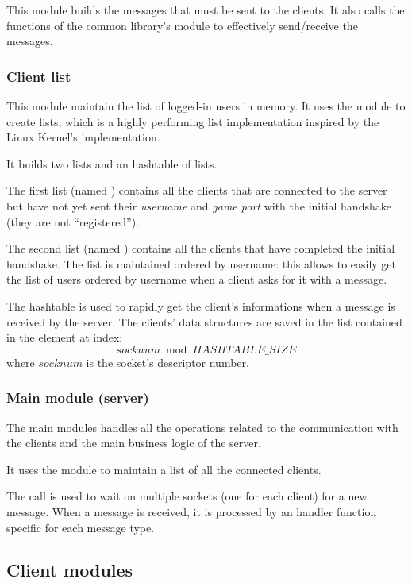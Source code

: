 This module builds the messages that must be sent to the clients. It also calls
the functions of the common library's  module to effectively
send/receive the messages.

\subsubsection{Client list}

This module maintain the list of logged-in users in memory. It uses the
 module to create lists, which is a highly performing list
implementation inspired by the Linux Kernel's  implementation.

It builds two lists and an hashtable of lists.

The first list (named ) contains all the clients that are
connected to the server but have not yet sent their \emph{username} and
\emph{game port} with the initial handshake (they are not ``registered'').

The second list (named ) contains all the clients that have
completed the initial handshake. The list is maintained ordered by username:
this allows to easily get the list of users ordered by username when a client
asks for it with a  message.

The hashtable is used to rapidly get the client's informations when a message is
received by the server. The clients' data structures are saved in the list
contained in the element at index: \[socknum \bmod HASHTABLE\_SIZE\] where
\(socknum\) is the socket's descriptor number.

\subsubsection{Main module (server)}

The main modules handles all the operations related to the communication with
the clients and the main business logic of the server.

It uses the  module to maintain a list of all the connected
clients.

The  call is used to wait on multiple sockets (one for each client)
for a new message. When a message is received, it is processed by an handler
function specific for each message type.


\subsection{Client modules}\label{subsec:clientmod}

